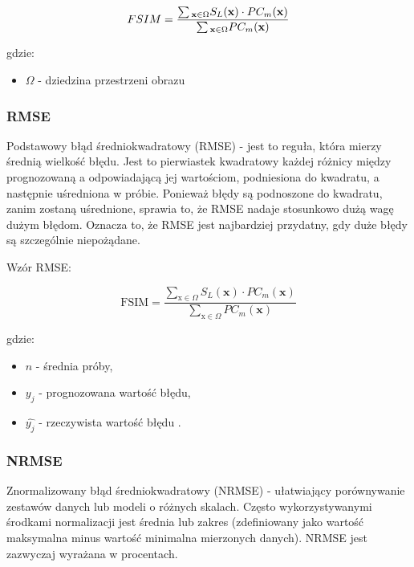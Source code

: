 \documentclass{article}
\begin{document}
\begin{equation}
  {FSIM} = {{\sum\limits {_{{\bf x} \in \Omega } {S_{L}}({\bf x}) \cdot PC_{m}({\bf x})} } \over {\sum\limits {_{{\bf x} \in \Omega } PC_{m}({\bf x})}}}
\end{equation}

gdzie:
\begin{itemize}[label=]
  \item $\Omega$ - dziedzina przestrzeni obrazu
\end{itemize}

\subsubsection{RMSE}

Podstawowy błąd średniokwadratowy (RMSE) - jest to reguła, która mierzy średnią wielkość błędu. Jest to pierwiastek kwadratowy każdej różnicy między prognozowaną a odpowiadającą jej wartościom, podniesiona do kwadratu, a następnie uśredniona w próbie. Ponieważ błędy są podnoszone do kwadratu, zanim zostaną uśrednione, sprawia to, że RMSE nadaje stosunkowo dużą wagę dużym błędom. Oznacza to, że RMSE jest najbardziej przydatny, gdy duże błędy są szczególnie niepożądane.

Wzór RMSE:

\begin{equation}
  \mathrm{FSIM}=\frac{\sum_{\mathrm{x} \in \Omega} S_{L}(\mathbf{x}) \cdot P C_{m}(\mathbf{x})}{\sum_{\mathrm{x} \in \Omega} P C_{m}(\mathbf{x})}
\end{equation}

gdzie:
\begin{itemize}[label=]
  \item $n$ - średnia próby,
  \item $y_{j}$ - prognozowana wartość błędu,
  \item $\hat{y_{j}}$ - rzeczywista wartość błędu \cite{rmse}.
\end{itemize}

\subsubsection{NRMSE}

Znormalizowany błąd średniokwadratowy (NRMSE) - ułatwiający porównywanie zestawów danych lub modeli o różnych skalach. Często wykorzystywanymi środkami normalizacji jest średnia lub zakres (zdefiniowany jako wartość maksymalna minus wartość minimalna mierzonych danych). NRMSE jest zazwyczaj wyrażana w procentach.
\end{document}

